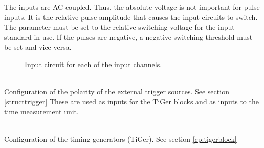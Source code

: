 		\noindent The inputs are AC coupled. Thus, the absolute voltage is not important for pulse inputs.
		It is the relative pulse amplitude that causes the input circuits to switch.
		The parameter must be set to the relative switching voltage for the input standard in use.
		If the pulses are negative, a negative switching threshold must be set and vice versa.
	\begin{figure}
		\begin{center}
			\caption{Input circuit for each of the input channels. \label{fig:dcoffset1}}
		\end{center}
	\end{figure}

	\\
	Configuration of the polarity of the external trigger sources. See section \ref{structtrigger}
	These are used as inputs for the TiGer blocks and as inputs to the time measurement unit.\par

	\\
	Configuration of the timing generators (TiGer). See section \ref{cp:tigerblock}

